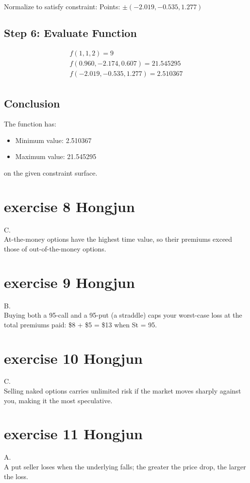 \documentclass{article}
\begin{document}
Normalize to satisfy constraint:
Points: $\pm(-2.019, -0.535, 1.277)$

\subsection*{Step 6: Evaluate Function}
\begin{align*}
f(1,1,2) = 9 \\
f(0.960, -2.174, 0.607) = 21.545295 \\
f(-2.019, -0.535, 1.277) = 2.510367 \\
\end{align*}

\subsection*{Conclusion}
The function has:
\begin{itemize}
\item Minimum value: 2.510367
\item Maximum value: 21.545295
\end{itemize}
on the given constraint surface.


\section{exercise 8 Hongjun}
C.\\
At-the-money options have the highest time value, so their premiums exceed those of out-of-the-money options.

\section{exercise 9 Hongjun}
B.\\
Buying both a 95-call and a 95-put (a straddle) caps your worst-case loss at the total premiums paid: \$8 + \$5 = \$13 when St = 95.

\section{exercise 10 Hongjun}
C.\\
Selling naked options carries unlimited risk if the market moves sharply against you, making it the most speculative.

\section{exercise 11 Hongjun}
A.\\
A put seller loses when the underlying falls; the greater the price drop, the larger the loss.
\end{document}
